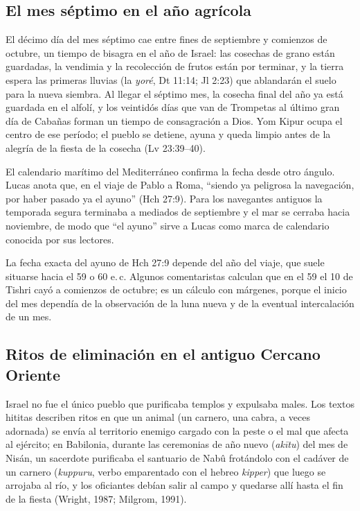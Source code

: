 \documentclass[11pt,letterpaper]{article}
\begin{document}
\subsection{El mes séptimo en el año agrícola}
El décimo día del mes séptimo cae entre fines de septiembre y comienzos de octubre, un tiempo de bisagra en el año de Israel: las cosechas de grano están guardadas, la vendimia y la recolección de frutos están por terminar, y la tierra espera las primeras lluvias (la \emph{yoré}, Dt 11:14; Jl 2:23) que ablandarán el suelo para la nueva siembra. Al llegar el séptimo mes, la cosecha final del año ya está guardada en el alfolí, y los veintidós días que van de Trompetas al último gran día de Cabañas forman un tiempo de consagración a Dios. Yom Kipur ocupa el centro de ese período; el pueblo se detiene, ayuna y queda limpio antes de la alegría de la fiesta de la cosecha (Lv 23:39--40).

El calendario marítimo del Mediterráneo confirma la fecha desde otro ángulo. Lucas anota que, en el viaje de Pablo a Roma, ``siendo ya peligrosa la navegación, por haber pasado ya el ayuno'' (Hch 27:9). Para los navegantes antiguos la temporada segura terminaba a mediados de septiembre y el mar se cerraba hacia noviembre, de modo que ``el ayuno'' sirve a Lucas como marca de calendario conocida por sus lectores.

\begin{nota}
La fecha exacta del ayuno de Hch 27:9 depende del año del viaje, que suele situarse hacia el 59 o 60 e.\,c. Algunos comentaristas calculan que en el 59 el 10 de Tishri cayó a comienzos de octubre; es un cálculo con márgenes, porque el inicio del mes dependía de la observación de la luna nueva y de la eventual intercalación de un mes.
\end{nota}

\subsection{Ritos de eliminación en el antiguo Cercano Oriente}
Israel no fue el único pueblo que purificaba templos y expulsaba males. Los textos hititas describen ritos en que un animal (un carnero, una cabra, a veces adornada) se envía al territorio enemigo cargado con la peste o el mal que afecta al ejército; en Babilonia, durante las ceremonias de año nuevo (\emph{akītu}) del mes de Nisán, un sacerdote purificaba el santuario de Nabû frotándolo con el cadáver de un carnero (\emph{kuppuru}, verbo emparentado con el hebreo \emph{kipper}) que luego se arrojaba al río, y los oficiantes debían salir al campo y quedarse allí hasta el fin de la fiesta (Wright, 1987; Milgrom, 1991).
\end{document}
